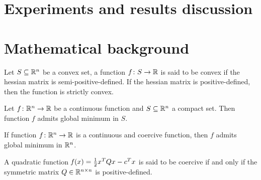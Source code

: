 \section{Experiments and results discussion}\label{sc:exp}




\cleardoublepage
\section{Mathematical background}

\begin{defs}\label{def:conv_fun}
	Let $S\subseteq\mathbb{R}^n$ be a convex set, a function $f\colon S\to\mathbb{R}$ is said to be convex if the hessian matrix is semi-positive-defined. If the hessian matrix is positive-defined, then the function is strictly convex.
\end{defs}

\begin{thm}\label{thm:weirs}
	Let $f\colon\mathbb{R}^n\to\mathbb{R}$ be a continuous function and $S\subseteq\mathbb{R}^n$ a compact set. Then function $f$ admits global minimum in $S$.
\end{thm}

\begin{cor}\label{cor:weirs1}
	If function $f\colon\mathbb{R}^n\to\mathbb{R}$ is a continuous and coercive function, then $f$ admits global minimum in $\mathbb{R}^n$.
\end{cor}

\begin{prop}
	A quadratic function $\operatorname*{\mathit{f}}(x)=\frac{1}{2}x^TQx-c^Tx$ is said to be coercive if and only if the symmetric matrix $Q\in\mathbb{R}^{n\times n}$ is positive-defined.
\end{prop}

